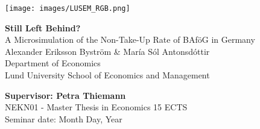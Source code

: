 
    \texttt{[image: images/LUSEM\_RGB.png]} %

\vspace{2cm}
    \begin{center}       
        \vspace*{2cm}
        {\LARGE {\textbf{Still Left Behind?}  \\ 
            A Microsimulation of the Non-Take-Up Rate of BAföG in Germany
        }} \\
        \vspace{1cm}
        \Large{Alexander Eriksson Byström \& María Sól Antonsdóttir} \normalsize{\\ Department of Economics \\ Lund University School of Economics and Management}
    \end{center}
    \vspace{2cm}

\vfill
\noindent 
\textbf{Supervisor: Petra Thiemann} \\ 
NEKN01 - Master Thesis in Economics 15 ECTS \\ 
Seminar date: Month Day, Year
\thispagestyle{empty}

\newpage
\tableofcontents
\thispagestyle{empty}
